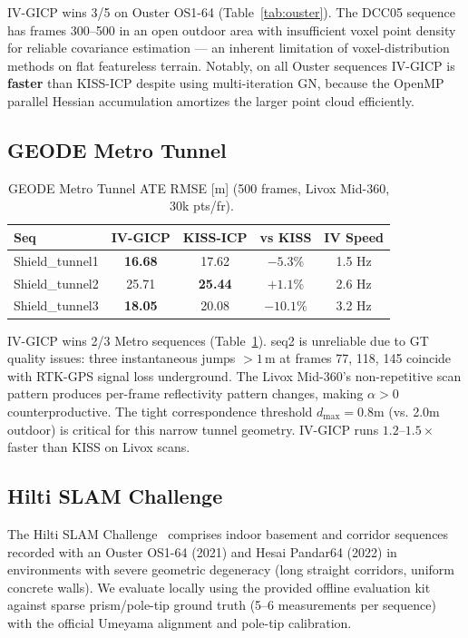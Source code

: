\documentclass[letterpaper, 10pt, conference]{ieeeconf}
\newcommand{\best}[1]{\textbf{#1}}
\begin{document}
IV-GICP wins 3/5 on Ouster OS1-64 (Table~\ref{tab:ouster}).
The DCC05 sequence has frames 300--500 in an open outdoor area with insufficient
voxel point density for reliable covariance estimation — an inherent limitation
of voxel-distribution methods on flat featureless terrain.
Notably, on all Ouster sequences IV-GICP is \textbf{faster} than KISS-ICP
despite using multi-iteration GN, because the OpenMP parallel Hessian
accumulation amortizes the larger point cloud efficiently.

\subsection{GEODE Metro Tunnel}\label{sec:metro}

\begin{table}[t]
\centering
\caption{GEODE Metro Tunnel ATE RMSE [m] (500 frames, Livox Mid-360, ~30k pts/fr).}
\label{tab:metro}
\begin{tabular}{lcccc}
\toprule
Seq & IV-GICP & KISS-ICP & vs KISS & IV Speed \\
\midrule
Shield\_tunnel1 & \best{16.68} & 17.62 & $-5.3\%$ & 1.5 Hz \\
Shield\_tunnel2 & 25.71 & \best{25.44} & $+1.1\%$ & 2.6 Hz \\
Shield\_tunnel3 & \best{18.05} & 20.08 & $-10.1\%$ & 3.2 Hz \\
\bottomrule
\end{tabular}
\end{table}

IV-GICP wins 2/3 Metro sequences (Table~\ref{tab:metro}).
seq2 is unreliable due to GT quality issues: three instantaneous jumps
$>1\,\mathrm{m}$ at frames 77, 118, 145 coincide with RTK-GPS signal loss underground.
The Livox Mid-360's non-repetitive scan pattern produces per-frame reflectivity
pattern changes, making $\alpha > 0$ counterproductive.
The tight correspondence threshold $d_{\max}{=}0.8$m (vs. 2.0m outdoor) is critical
for this narrow tunnel geometry.
IV-GICP runs $1.2$--$1.5\times$ faster than KISS on Livox scans.

\subsection{Hilti SLAM Challenge}\label{sec:hilti}

The Hilti SLAM Challenge~\cite{helmberger2022hilti} comprises indoor basement and
corridor sequences recorded with an Ouster OS1-64 (2021) and Hesai Pandar64 (2022)
in environments with severe geometric degeneracy (long straight corridors, uniform
concrete walls).
We evaluate locally using the provided offline evaluation kit against sparse
prism/pole-tip ground truth (5--6 measurements per sequence) with the official
Umeyama alignment and pole-tip calibration.
\end{document}

